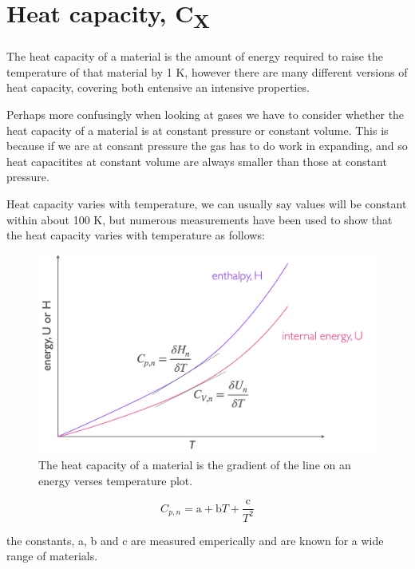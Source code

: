 \documentclass[
]{book}
\begin{document}
\hypertarget{heat-capacity-cx}{%
\section{\texorpdfstring{Heat capacity, C\textsubscript{X}}{Heat capacity, CX}}\label{heat-capacity-cx}}

The heat capacity of a material is the amount of energy required to raise the temperature of that material by 1 K, however there are many different versions of heat capacity, covering both entensive an intensive properties.

Perhaps more confusingly when looking at gases we have to consider whether the heat capacity of a material is at constant pressure or constant volume. This is because if we are at consant pressure the gas has to do work in expanding, and so heat capacitites at constant volume are always smaller than those at constant pressure.

Heat capacity varies with temperature, we can usually say values will be constant within about 100 K, but numerous measurements have been used to show that the heat capacity varies with temperature as follows:

\begin{figure}

{\centering \includegraphics[width=0.7\linewidth]{images/heatcapacitypV} 

}

\caption{The heat capacity of a material is the gradient of the line on an energy verses temperature plot.}\label{fig:heatcapacitypV}
\end{figure}

\begin{equation}
C_{p,n}=\textrm{a}+\textrm{b}T+\frac{\textrm{c}}{T^2}
\label{eq:heatcapacitytemp}
\end{equation}

the constants, a, b and c are measured emperically and are known for a wide range of materials.
\end{document}

